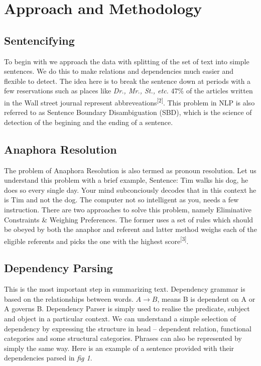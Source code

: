 \documentclass[conference]{IEEEtran}
\begin{document}
\section{Approach and Methodology}

\subsection{Sentencifying}
To begin with we approach the data with splitting of the set of text into simple sentences.
We do this to make relations and dependencies much easier and flexible to detect. The idea here is to break the sentence down at periods with a few reservations such as places like \textit{Dr., Mr., St., etc.} 47\% of the articles written in the Wall street journal represent abbreveations\textsuperscript{[2]}. This problem in NLP is also referred to as Sentence Boundary Disambiguation (SBD), which is the science of detection of the begining and the ending of a sentence.

\subsection{Anaphora Resolution}
The problem of Anaphora Resolution is also termed as pronoun resolution. Let us understand this problem with a brief example, Sentence: Tim walks his dog, he does so every single day. Your mind subconciously decodes that in this context he is Tim and not the dog. The computer not so intelligent as you, needs a few instruction. There are two approaches to solve this problem, namely Eliminative Constraints \& Weighing Preferences. The former uses a set of rules which should be obeyed by both the anaphor and referent and latter method weighs each of the eligible referents and picks the one with the highest score\textsuperscript{[3]}.

\subsection{Dependency Parsing}
This is the most important step in summarizing text. Dependency grammar is based on the relationships between words. $A \rightarrow B$, means B is dependent on A or A governs B. Dependency Parser is simply used to realise the predicate, subject and object in a particular context. We can understand a simple selection of dependency by expressing the structure in head -- dependent relation, functional categories and some structural categories. Phrases can also be represented by simply the same way. Here is an example of a sentence provided with their dependencies parsed in \textit{fig 1}.
\end{document}

